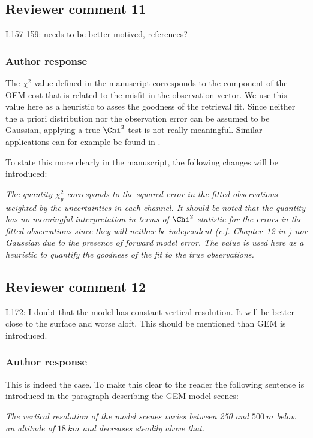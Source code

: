 \documentclass[11pt]{scrartcl}
\begin{document}
\subsection*{Reviewer comment 11}
L157-159: needs to be better motived, references?

\subsubsection*{Author response}

The $\chi^2$ value defined in the manuscript corresponds to the component of the OEM cost that
is related to the misfit in the observation vector. We use this value here as a heuristic
to asses the goodness of the retrieval fit. Since neither the a priori distribution nor the
observation error can be assumed to be Gaussian, applying a true $\Chi^2$-test is not really
meaningful. Similar applications can for example be found in \citet{duncan16}.

To state this more clearly in the manuscript, the following changes will be introduced:

\textit{The quantity $\chi^2_y$ corresponds to the squared error in the fitted
  observations weighted by the uncertainties in each channel. It should be noted
  that the quantity has no meaningful interpretation in terms of
  $\Chi^2$-statistic for the errors in the fitted observations since they will
  neither be independent (c.f. Chapter~12 in \cite{rodgers00}) nor Gaussian due
  to the presence of forward model error. The value is used here as a heuristic
  to quantify the goodness of the fit to the true observations.}


\subsection*{Reviewer comment 12}
L172: I doubt that the model has constant vertical resolution.  It will be better close to the surface and worse aloft. This should be mentioned than GEM is introduced.

\subsubsection*{Author response}

This is indeed the case. To make this clear to the reader the following sentence
is introduced in the paragraph describing the GEM model scenes:

\textit{The vertical resolution of the model scenes varies between 250
and $500\ \unit{m}$ below an altitude of $18\ \unit{km}$ and decreases
steadily above that.}
\end{document}
